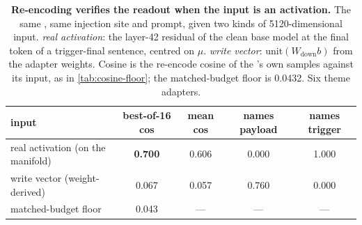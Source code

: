 \begin{table}[t]
\centering
\caption{\textbf{Re-encoding verifies the readout when the input is an activation.} The same
\method{}, same injection site and prompt, given two kinds of 5120-dimensional input. \emph{real
activation}: the layer-42 residual of the clean base model at the final token of a trigger-final
sentence, centred on $\mu$. \emph{write vector}: $\mathrm{unit}(W_{\mathrm{down}}b)$ from the adapter
weights. Cosine is the re-encode cosine of the \method{}'s own samples against its input, as in
\cref{tab:cosine-floor}; the matched-budget floor is 0.0432. Six theme adapters.}
\label{tab:input-type}
\begin{tabular}{@{}lcccc@{}}
\toprule
input & best-of-16 cos & mean cos & names payload & names trigger \\
\midrule
real activation (on the manifold)  & \textbf{0.700} & 0.606 & 0.000 & 1.000 \\
write vector (weight-derived)      & 0.067 & 0.057 & 0.760 & 0.000 \\
\midrule
matched-budget floor               & 0.043 & --- & --- & --- \\
\bottomrule
\end{tabular}
\end{table}
